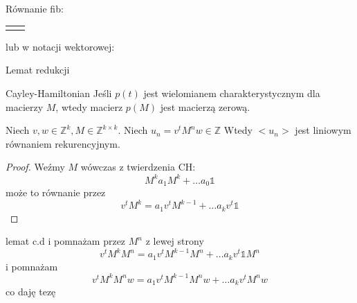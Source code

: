 \documentclass{beamer}
\theoremstyle{definition}
\begin{document}
\begin{frame}{Równanie fib:}
\begin{table}[]
\begin{tabular}{c|c}
\begin{equation*}
    \end{equation*}

    \end{tabular}
\end{table}

lub w notacji wektorowej:


\end{frame}

\begin{frame}{Lemat redukcji}

\begin{theorem}{Cayley-Hamiltonian}
    Jeśli $p(t)$ jest wielomianem charakterystycznym dla macierzy $M$, wtedy macierz $p(M)$ jest macierzą zerową. 
\end{theorem}

\begin{theorem}

    Niech $v, w \in \mathbb{Z}^{k}, M \in \mathbb{Z}^{k\times k}$.
    Niech $u_n = v^{t}M^{n}w \in \mathbb{Z}$
    Wtedy $<u_n>$ jest liniowym równaniem rekurencyjnym. 

\end{theorem}



\begin{proof}
    Weźmy $M$ wówczas z twierdzenia CH: 
    $$M^{k} a_1 M^{k} + \ldots a_0 \mathbb{1}$$ 
    może to równanie przez 
    $$ v^{t}M^{k} = a_1 v^{t} M^{k-1} + \ldots a_k v^{t} \mathbb{1}$$ 
\end{proof}

\end{frame}

\begin{frame}{lemat c.d}
i pomnażam przez $M^{n}$ z lewej strony 
      $$ v^{t}M^{k} M^{n} = a_1 v^{t} M^{k-1} M^{n} + \ldots a_k v^{t} \mathbb{1} M^{n}$$ 
      i pomnażam 
      $$ v^{t}M^{k} M^{n} w = a_1 v^{t} M^{k-1} M^{n}w + \ldots a_k v^{t} M^{n}w $$ 
      co daję tezę
\end{frame}
\end{document}
